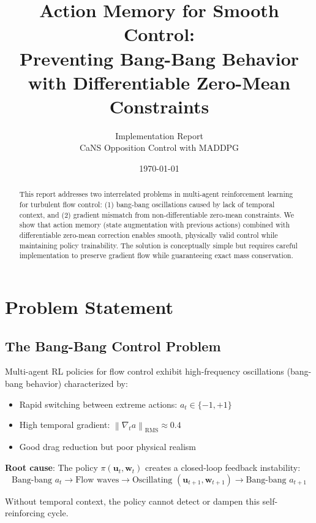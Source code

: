 \documentclass[11pt,a4paper]{article}
\title{Action Memory for Smooth Control:\\Preventing Bang-Bang Behavior with Differentiable Zero-Mean Constraints}
\author{Implementation Report\\CaNS Opposition Control with MADDPG}
\date{\today}
\newcommand{\norm}[1]{\left\|#1\right\|}
\theoremstyle{definition}
\begin{document}
\maketitle

\begin{abstract}
This report addresses two interrelated problems in multi-agent reinforcement learning for turbulent flow control: (1) bang-bang oscillations caused by lack of temporal context, and (2) gradient mismatch from non-differentiable zero-mean constraints. We show that action memory (state augmentation with previous actions) combined with differentiable zero-mean correction enables smooth, physically valid control while maintaining policy trainability. The solution is conceptually simple but requires careful implementation to preserve gradient flow while guaranteeing exact mass conservation.
\end{abstract}

\tableofcontents
\newpage

\section{Problem Statement}

\subsection{The Bang-Bang Control Problem}

Multi-agent RL policies for flow control exhibit high-frequency oscillations (bang-bang behavior) characterized by:
\begin{itemize}
    \item Rapid switching between extreme actions: $a_t \in \{-1, +1\}$
    \item High temporal gradient: $\norm{\nabla_t a}_{\text{RMS}} \approx 0.4$
    \item Good drag reduction but poor physical realism
\end{itemize}

\textbf{Root cause}: The policy $\pi(\mathbf{u}_t, \mathbf{w}_t)$ creates a closed-loop feedback instability:
\begin{equation}
    \text{Bang-bang } a_t \to \text{Flow waves} \to \text{Oscillating } (\mathbf{u}_{t+1}, \mathbf{w}_{t+1}) \to \text{Bang-bang } a_{t+1}
\end{equation}

Without temporal context, the policy cannot detect or dampen this self-reinforcing cycle.
\end{document}
